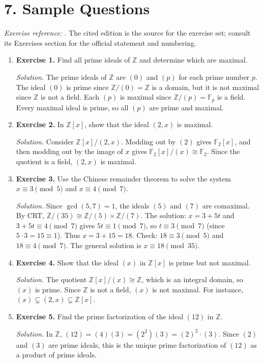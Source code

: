 \section*{7. Sample Questions}
\emph{Exercise reference:} \cite{ideal_theory_ref1}. The cited edition is the source for the exercise set; consult its Exercises section for the official statement and numbering.
\begin{enumerate}[leftmargin=*,itemsep=0.9em]
\item \textbf{Exercise 1.} Find all prime ideals of $\mathbb{Z}$ and determine which are maximal.

\emph{Solution.} The prime ideals of $\mathbb{Z}$ are $(0)$ and $(p)$ for each prime number $p$. The ideal $(0)$ is prime since $\mathbb{Z}/(0)=\mathbb{Z}$ is a domain, but it is not maximal since $\mathbb{Z}$ is not a field. Each $(p)$ is maximal since $\mathbb{Z}/(p)=\mathbb{F}_p$ is a field. Every maximal ideal is prime, so all $(p)$ are prime and maximal.

\item \textbf{Exercise 2.} In $\mathbb{Z}[x]$, show that the ideal $(2,x)$ is maximal.

\emph{Solution.} Consider $\mathbb{Z}[x]/(2,x)$. Modding out by $(2)$ gives $\mathbb{F}_2[x]$, and then modding out by the image of $x$ gives $\mathbb{F}_2[x]/(x)\cong\mathbb{F}_2$. Since the quotient is a field, $(2,x)$ is maximal.

\item \textbf{Exercise 3.} Use the Chinese remainder theorem to solve the system $x\equiv 3\pmod{5}$ and $x\equiv 4\pmod{7}$.

\emph{Solution.} Since $\gcd(5,7)=1$, the ideals $(5)$ and $(7)$ are comaximal. By CRT, $\mathbb{Z}/(35)\cong\mathbb{Z}/(5)\times\mathbb{Z}/(7)$. The solution: $x=3+5t$ and $3+5t\equiv 4\pmod{7}$ gives $5t\equiv 1\pmod{7}$, so $t\equiv 3\pmod{7}$ (since $5\cdot 3=15\equiv 1$). Thus $x=3+15=18$. Check: $18\equiv 3\pmod{5}$ and $18\equiv 4\pmod{7}$. The general solution is $x\equiv 18\pmod{35}$.

\item \textbf{Exercise 4.} Show that the ideal $(x)$ in $\mathbb{Z}[x]$ is prime but not maximal.

\emph{Solution.} The quotient $\mathbb{Z}[x]/(x)\cong\mathbb{Z}$, which is an integral domain, so $(x)$ is prime. Since $\mathbb{Z}$ is not a field, $(x)$ is not maximal. For instance, $(x)\subsetneq(2,x)\subsetneq\mathbb{Z}[x]$.

\item \textbf{Exercise 5.} Find the prime factorization of the ideal $(12)$ in $\mathbb{Z}$.

\emph{Solution.} In $\mathbb{Z}$, $(12)=(4)(3)=(2^2)(3)=(2)^2\cdot(3)$. Since $(2)$ and $(3)$ are prime ideals, this is the unique prime factorization of $(12)$ as a product of prime ideals.

\end{enumerate}

